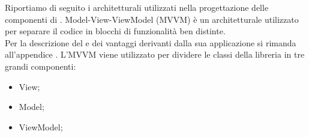 		Riportiamo di seguito i  architetturali utilizzati nella progettazione delle componenti di .
			Model-View-ViewModel (MVVM) è un  architetturale utilizzato per separare il codice in blocchi di funzionalità ben distinte.\\
			Per la descrizione del  e dei vantaggi derivanti dalla sua applicazione si rimanda all'appendice .
				L'MVVM viene utilizzato per dividere le classi della libreria  in tre grandi componenti:
				\begin{itemize}
					\item View;
					\item Model;
					\item ViewModel;
				\end{itemize}
	
